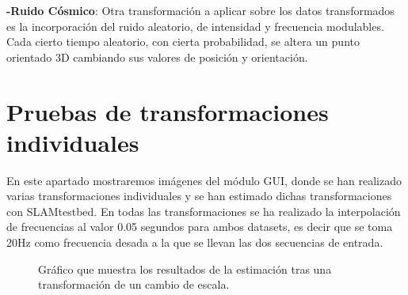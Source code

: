 \textbf{-Ruido Cósmico}: Otra transformación a aplicar sobre los datos transformados es la incorporación del ruido aleatorio, de intensidad y frecuencia modulables. Cada cierto tiempo aleatorio, con cierta probabilidad, se altera un punto orientado 3D cambiando sus valores de posición y orientación.


\section{Pruebas de transformaciones individuales}

En este apartado mostraremos imágenes del módulo GUI, donde se han realizado varias transformaciones individuales y se han estimado dichas transformaciones con SLAMtestbed.
En todas las transformaciones se ha realizado la interpolación de frecuencias al valor 0.05 segundos para ambos datasets, es decir que se toma 20Hz como frecuencia desada a la que se llevan las dos secuencias de entrada.

\begin{figure}
\begin{center}
\hspace{0.5cm}

\end{center}

\caption{Gráfico que muestra los resultados de la estimación tras una transformación de un cambio de escala.}
\end{figure}

